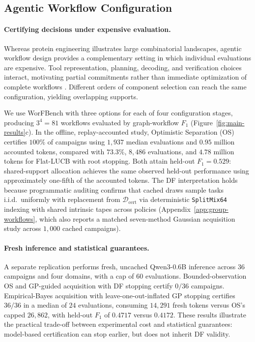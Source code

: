 \documentclass{article}
\theoremstyle{plain}
\theoremstyle{definition}
\begin{document}
\subsection{Agentic Workflow Configuration}
\label{sec:exp-workflows}

\paragraph{Certifying decisions under expensive evaluation.}
Whereas protein engineering illustrates large combinatorial
landscapes, agentic workflow design provides a complementary
setting in which individual evaluations are expensive.
Tool representation, planning, decoding, and verification
choices interact, motivating partial commitments rather than
immediate optimization of complete workflows
\citep{zhang2025aflow}. Different orders of component selection
can reach the same configuration, yielding overlapping supports.

We use WorFBench \citep{qiao2025worfbench} with three options
for each of four configuration stages, producing $3^4=81$
workflows evaluated by graph-workflow $F_1$ (Figure~\ref{fig:main-results}c).
In the offline, replay-accounted study, Optimistic Separation
(OS) certifies $100\%$ of campaigns using $1{,}937$ median
evaluations and $0.95$ million accounted tokens, compared with
$73.3\%$, $8{,}486$ evaluations, and $4.78$ million tokens for
Flat-LUCB with root stopping. Both attain held-out $F_1=0.529$:
shared-support allocation achieves the same observed held-out
performance using approximately one-fifth of the accounted tokens.
The DF interpretation holds because programmatic auditing confirms
that cached draws sample tasks i.i.d.\ uniformly with replacement
from $\mathcal D_{\mathrm{cert}}$ via deterministic
\texttt{SplitMix64} indexing with shared intrinsic tapes across
policies (Appendix~\ref{app:group-workflows}, which also reports
a matched seven-method Gaussian acquisition study across $1{,}000$
cached campaigns).

\paragraph{Fresh inference and statistical guarantees.}
A separate replication performs fresh, uncached Qwen3-0.6B
inference across $36$ campaigns and four domains, with a cap
of $60$ evaluations. Bounded-observation OS and GP-guided
acquisition with DF stopping certify $0/36$ campaigns.
Empirical-Bayes acquisition with leave-one-out-inflated GP
stopping certifies $36/36$ in a median of $24$ evaluations,
consuming $14{,}291$ fresh tokens versus OS's capped $26{,}862$,
with held-out $F_1$ of $0.4717$ versus $0.4172$.
These results illustrate the practical trade-off between
experimental cost and statistical guarantees: model-based
certification can stop earlier, but does not inherit DF validity.
\end{document}
